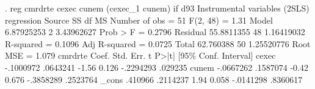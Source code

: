 . reg cmrdrte cexec cunem (cexec_1 cunem) if d93
{\smallskip}
Instrumental variables (2SLS) regression
{\smallskip}
      Source {\VBAR}       SS           df       MS      Number of obs   =        51
   F(2, 48)        =      1.31
       Model {\VBAR}  6.87925253         2  3.43962627   Prob > F        =    0.2796
    Residual {\VBAR}  55.8811355        48  1.16419032   R-squared       =    0.1096
   Adj R-squared   =    0.0725
       Total {\VBAR}   62.760388        50  1.25520776   Root MSE        =     1.079
{\smallskip}
     cmrdrte {\VBAR}      Coef.   Std. Err.      t    P>|t|     [95\% Conf. Interval]
       cexec {\VBAR}  -.1000972   .0643241    -1.56   0.126    -.2294293     .029235
       cunem {\VBAR}  -.0667262   .1587074    -0.42   0.676    -.3858289    .2523764
       _cons {\VBAR}    .410966   .2114237     1.94   0.058    -.0141298    .8360617
{\smallskip}
